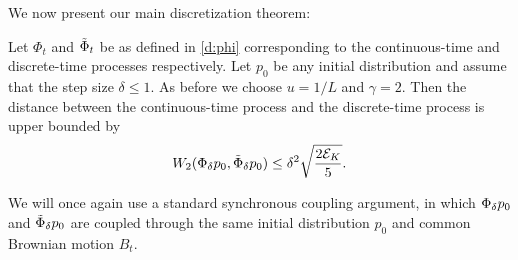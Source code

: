 We now present our main discretization theorem:
\begin{theorem}\label{t:discretizationerror}
Let $\Phi_t$ and $\tilde{\Phi}_t$ be as defined in \eqref{d:phi} corresponding to the continuous-time and discrete-time processes respectively. Let $p_0$ be any initial distribution and assume that the step size $\delta\le 1$. As before we choose $u = 1/L$ and $\gamma = 2$. Then the distance between the continuous-time process and the discrete-time process is upper bounded by
$$W_2(\Phi_\delta p_0,\tilde{\Phi}_\delta p_0)\leq \delta^2 \sqrt{\frac{2\mathcal{E}_K}{5}}.$$
\end{theorem}
\begin{Proof} We will once again use a standard synchronous coupling argument, in which $\Phi_\delta p_0$ and $\tilde{\Phi}_\delta p_0$ are coupled through the same initial distribution $p_0$ and common Brownian motion $B_t$. 


\end{Proof}
